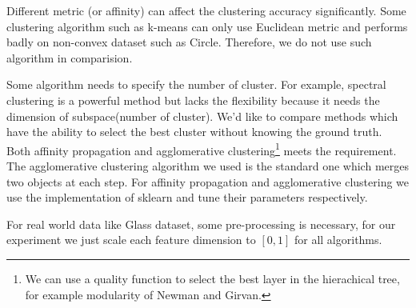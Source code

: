 \documentclass{article}
\begin{document}
Different metric (or affinity) can affect the clustering accuracy significantly. Some clustering algorithm such as \textsf{k-means} can only use Euclidean metric and performs badly on non-convex dataset such as \textsf{Circle}. Therefore, we do not use such algorithm in comparision. 

Some algorithm needs to specify the number of cluster.  For example, spectral clustering is a powerful method but lacks the flexibility because it needs the dimension of subspace(number of cluster).  We'd like to compare methods which have the ability to select the best cluster without knowing the ground truth. Both \textsf{affinity propagation} and \textsf{agglomerative clustering}\footnote{We can use a quality function to select the best layer in the hierachical tree, for example modularity of Newman and Girvan.} meets the requirement. The agglomerative clustering algorithm we used is the standard one which merges two objects at each step. For \textsf{affinity propagation} and \textsf{agglomerative clustering} we use the implementation of \textsf{sklearn} and tune their parameters respectively.

For real world data like Glass dataset, some pre-processing is necessary, for our experiment we just scale each feature dimension to $[0, 1]$ for all algorithms.


\end{document}

